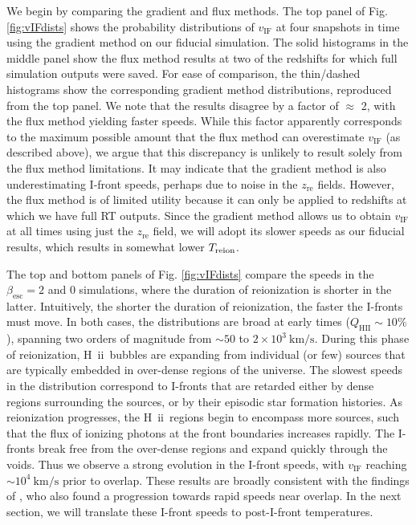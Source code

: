 \documentclass[twocolumn]{aastex62}
\newcommand{\zreion}{z_{\mathrm{re}}}
\newcommand{\HII}{H{\sc~ii}}
\newcommand{\Treion}{T_{\rm reion}}
\newcommand{\vIF}{v_{\mathrm{IF}}}
\begin{document}
We begin by comparing the gradient and flux methods.  The top panel of Fig. \ref{fig:vIFdists} shows the probability distributions of $\vIF$ at four snapshots in time using the gradient method on our fiducial simulation.  The solid histograms in the middle panel show the flux method results at two of the redshifts for which full simulation outputs were saved.  For ease of comparison, the thin/dashed histograms show the corresponding gradient method distributions, reproduced from the top panel.  We note that the results disagree by a factor of $\approx$ 2, with the flux method yielding faster speeds.  While this factor apparently corresponds to the maximum possible amount that the flux method can overestimate $\vIF$ (as described above), we argue that this discrepancy is unlikely to result solely from the flux method limitations.  It may indicate that the gradient method is also underestimating I-front speeds, perhaps due to noise in the $\zreion$ fields.  However, the flux method is of limited utility because it can only be applied to redshifts at which we have full RT outputs.  Since the gradient method allows us to obtain $\vIF$ at all times using just the $\zreion$ field, we will adopt its slower speeds as our fiducial results, which results in somewhat lower $\Treion$. 

The top and bottom panels of Fig. \ref{fig:vIFdists} compare the speeds in the $\beta_{\mathrm{esc}} = 2$ and $0$ simulations, where the duration of reionization is shorter in the latter.  Intuitively, the shorter the duration of reionization, the faster the I-fronts must move.  In both cases, the distributions are broad at early times ($Q_{\mathrm{HII}}\sim 10\%$), spanning two orders of magnitude from $\sim 50$ to $2 \times 10^3~\mathrm{km/s}$.   During this phase of reionization, \HII\ bubbles are expanding from individual (or few) sources that are typically embedded in over-dense regions of the universe.  The slowest speeds in the distribution correspond to I-fronts that are retarded either by dense regions surrounding the sources, or by their episodic star formation histories.   As reionization progresses, the \HII\ regions begin to encompass more sources, such that the flux of ionizing photons at the front boundaries increases rapidly.   The I-fronts break free from the over-dense regions and expand quickly through the voids.  Thus we observe a strong evolution in the I-front speeds, with $\vIF$ reaching $\sim 10^4~\mathrm{km/s}$ prior to overlap.  These results are broadly consistent with the findings of \citet{2018arXiv180301634D}, who also found a progression towards rapid speeds near overlap.  In the next section, we will translate these I-front speeds to post-I-front temperatures.  
\end{document}
